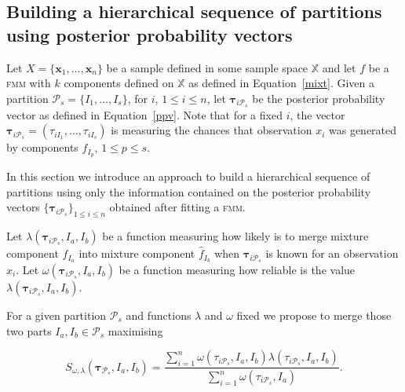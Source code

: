 \documentclass[10pt, a4paper]{article}
\newcommand{\m}[1]{\boldsymbol{#1}}
\newcommand{\fmm}{\textsc{fmm}\xspace}
\begin{document}
\begin{spacing}{1.9}
\section{Building a hierarchical sequence of partitions using posterior probability vectors}

Let $X = \{\m x_1,\dots,\m x_n \}$ be a sample defined in some sample space $\mathbb{X}$ and let $f$ be a \fmm with $k$ components defined on $\mathbb{X}$ as defined in Equation~\ref{mixt}. Given a partition $\mathcal{P}_s = \{I_1, \dots, I_s\}$, for $i$, $1\leq i \leq n $, let $\m\tau_{i \mathcal{P}_s}$ be the posterior probability vector as defined in Equation~\ref{ppv}. Note that for a fixed $i$, the vector $\m\tau_{i \mathcal{P}_s} =  \left( \tau_{i I_1} , \dots, \tau_{i I_s}  \right)$ is measuring the chances that observation $x_i$ was generated by components $f_{I_p}$, $1 \leq p \leq s$.

In this section we introduce an approach to build a hierarchical sequence of partitions using only the information contained on the posterior probability vectors $\{\m\tau_{i \mathcal{P}_s}\}_{1\leq i \leq n}$ obtained after fitting a \fmm.


Let $\lambda(\m\tau_{i \mathcal{P}_s},  I_a,  I_b)$ be a function measuring how likely is to merge mixture component $\hat{f}_{I_a}$ into mixture component $\hat{f}_{I_b}$ when $\m \tau_{i \mathcal{P}_s}$ is known for an observation $x_i$. Let $\omega(\m\tau_{i \mathcal{P}_s},  I_a,  I_b)$ be a function measuring how reliable is the value $\lambda(\m\tau_{i \mathcal{P}_s},  I_a,  I_b)$.



For a given partition $\mathcal{P}_s$ and functions $\lambda$ and $\omega$ fixed we propose to merge those two parts $I_a, I_b \in \mathcal{P}_s$ maximising

\begin{equation}\label{unifying_equation}
S_{\omega, \lambda}( \m\tau_{\mathcal{P}_s},  I_a,  I_b) = \frac{\sum_{i=1}^n \omega(\tau_{i \mathcal{P}_s}, I_a, I_b) \lambda(\tau_{i \mathcal{P}_s}, I_a, I_b)}{\sum_{i=1}^n \omega(\tau_{i \mathcal{P}_s}, I_a) }.
\end{equation}



\end{spacing}
\end{document}
